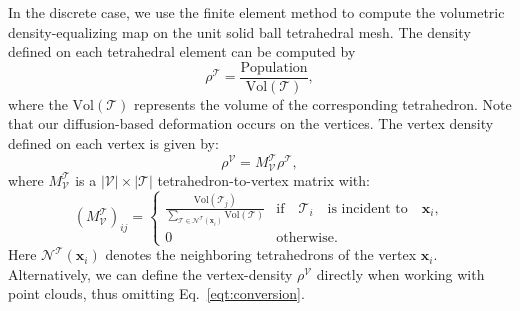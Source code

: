 \documentclass{article}
\begin{document}
In the discrete case, we use the finite element method to compute the volumetric density-equalizing map on the unit solid ball tetrahedral mesh. The density defined on each tetrahedral element can be computed by 
\begin{equation}
    \rho^\mathcal{T} = \frac{\text{Population}}{\text{Vol}(\mathcal{T})},
\end{equation}
where the $\text{Vol}(\mathcal{T})$ represents the volume of the corresponding tetrahedron. Note that our diffusion-based deformation occurs on the vertices. 
The vertex density defined on each vertex is given by:
\begin{equation}\label{eqt:conversion}
    \rho^\mathcal{V} = M^\mathcal{T}_{\mathcal{V}} \rho^\mathcal{T},
\end{equation}
where $M^\mathcal{T}_{\mathcal{V}}$ is a $|\mathcal{V}| \times |\mathcal{T}|$ tetrahedron-to-vertex matrix with:
\begin{equation}
\left(M^\mathcal{T}_{\mathcal{V}}\right)_{ij} = 
      \left \{
    \begin{array}{ll}
    \frac{\text{Vol}(\mathcal{T}_j)}{\sum_{\mathcal{T} \in \mathcal{N}^{\mathcal{T}}(\mathbf{x}_i)}\text{Vol}(\mathcal{T})}     & \text{if} \quad \mathcal{T}_i \quad \text{is incident to} \quad \mathbf{x}_i, \\
    0  & \text{otherwise}.
    \end{array}    
    \right.  
\end{equation}
Here $\mathcal{N}^{\mathcal{T}}(\mathbf{x}_i)$ denotes the neighboring tetrahedrons of the vertex $\mathbf{x}_i$. Alternatively, we can define the vertex-density $\rho^\mathcal{V}$ directly when working with point clouds, thus omitting Eq.~\eqref{eqt:conversion}. 
\end{document}

